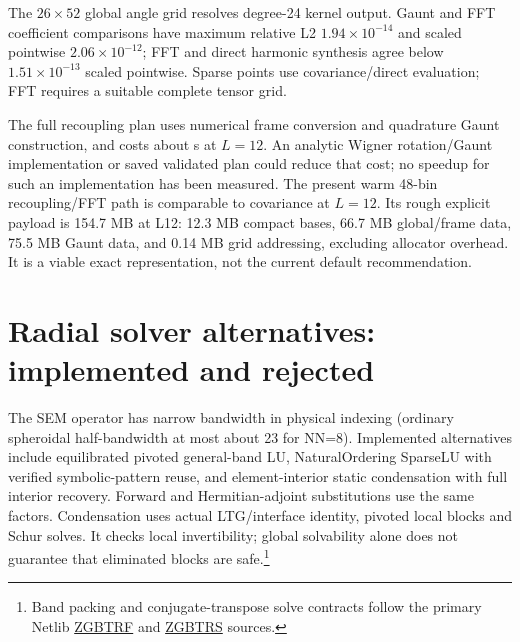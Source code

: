 The $26\times52$ global angle grid resolves degree-24 kernel output. Gaunt and FFT coefficient comparisons have maximum relative L2 $1.94\times10^{-14}$ and scaled pointwise $2.06\times10^{-12}$; FFT and direct harmonic synthesis agree below $1.51\times10^{-13}$ scaled pointwise. Sparse points use covariance/direct evaluation; FFT requires a suitable complete tensor grid.

The full recoupling plan uses numerical frame conversion and quadrature Gaunt construction, and costs about \SpectralPlanTwelve{} s at $L=12$. An analytic Wigner rotation/Gaunt implementation or saved validated plan could reduce that cost; no speedup for such an implementation has been measured. The present warm 48-bin recoupling/FFT path is comparable to covariance at $L=12$. Its rough explicit payload is 154.7 MB at L12: 12.3 MB compact bases, 66.7 MB global/frame data, 75.5 MB Gaunt data, and 0.14 MB grid addressing, excluding allocator overhead. It is a viable exact representation, not the current default recommendation.

\section{Radial solver alternatives: implemented and rejected}
The SEM operator has narrow bandwidth in physical indexing (ordinary spheroidal half-bandwidth at most about 23 for NN=8). Implemented alternatives include equilibrated pivoted general-band LU, NaturalOrdering SparseLU with verified symbolic-pattern reuse, and element-interior static condensation with full interior recovery. Forward and Hermitian-adjoint substitutions use the same factors. Condensation uses actual LTG/interface identity, pivoted local blocks and Schur solves. It checks local invertibility; global solvability alone does not guarantee that eliminated blocks are safe.\footnote{Band packing and conjugate-transpose solve contracts follow the primary Netlib \href{https://www.netlib.org/lapack/complex16/zgbtrf.f}{ZGBTRF} and \href{https://www.netlib.org/lapack/complex16/zgbtrs.f}{ZGBTRS} sources.}


